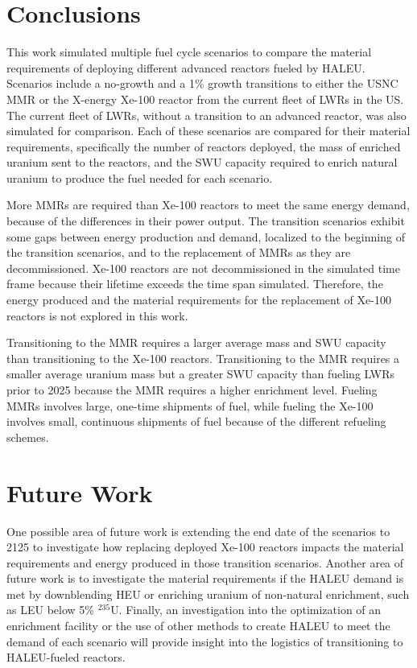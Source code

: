 \section{Conclusions}
This work simulated multiple fuel cycle scenarios to compare the 
material requirements of deploying different advanced reactors fueled 
by \gls{HALEU}. Scenarios include a no-growth and a 1\% growth 
transitions to either the \gls{USNC} \gls{MMR} or the X-energy Xe-100 
reactor from the current fleet of \glspl{LWR} in the US. The current 
fleet of \glspl{LWR}, without a transition to an advanced reactor, was 
also simulated for comparison. Each of these scenarios are compared 
for their material 
requirements, specifically the number of reactors deployed, the mass 
of enriched uranium sent to the reactors, and the \gls{SWU} capacity 
required to enrich natural uranium to produce the fuel needed for 
each scenario. 

More \glspl{MMR} are required than Xe-100 reactors to meet the same 
energy demand, because of the differences in their power output. 
The transition scenarios exhibit some gaps between  
energy production and demand, localized to the beginning of the 
transition
scenarios, and to the replacement of \glspl{MMR} as they are decommissioned. 
Xe-100 reactors are not decommissioned in the simulated time frame because 
their lifetime exceeds the time span simulated. Therefore, the 
energy produced and the material requirements for the replacement of 
Xe-100 reactors is not explored in this work. 

Transitioning to the \gls{MMR} requires 
a larger average mass and \gls{SWU} capacity than transitioning to the 
Xe-100 reactors. Transitioning to the \gls{MMR} requires a smaller average 
uranium mass but a greater \gls{SWU} capacity than fueling \glspl{LWR} prior 
to 2025 because the \gls{MMR} requires a higher enrichment level. 
Fueling \glspl{MMR} involves large, one-time shipments of fuel, while 
fueling the Xe-100 involves small, continuous shipments of fuel 
because of the different refueling schemes.

\section{Future Work}
One possible area of future work is extending the end date 
of the scenarios to 2125 to investigate how replacing deployed Xe-100 
reactors impacts the material requirements and energy produced in those 
transition scenarios. Another area of future work is to investigate the 
material requirements if the \gls{HALEU} demand is met by downblending 
\gls{HEU} or enriching uranium of non-natural enrichment, such as 
\gls{LEU} below 5\% $^{235}$U. Finally, an investigation into the 
optimization of an enrichment facility or the use of other methods to 
create \gls{HALEU} to meet the demand of each scenario will provide 
insight into the logistics of transitioning to \gls{HALEU}-fueled 
reactors. 

